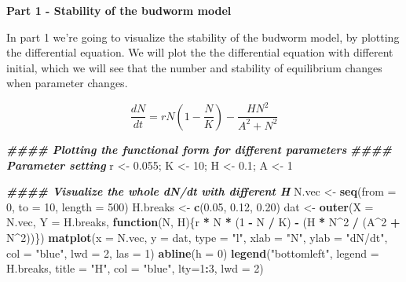 \documentclass[
]{book}
\newenvironment{Shaded}{\begin{snugshade}}{\end{snugshade}}
\newcommand{\AttributeTok}[1]{\textcolor[rgb]{0.13,0.29,0.53}{#1}}
\newcommand{\ControlFlowTok}[1]{\textcolor[rgb]{0.13,0.29,0.53}{\textbf{#1}}}
\newcommand{\DecValTok}[1]{\textcolor[rgb]{0.00,0.00,0.81}{#1}}
\newcommand{\DocumentationTok}[1]{\textcolor[rgb]{0.56,0.35,0.01}{\textbf{\textit{#1}}}}
\newcommand{\FloatTok}[1]{\textcolor[rgb]{0.00,0.00,0.81}{#1}}
\newcommand{\FunctionTok}[1]{\textcolor[rgb]{0.13,0.29,0.53}{\textbf{#1}}}
\newcommand{\NormalTok}[1]{#1}
\newcommand{\OtherTok}[1]{\textcolor[rgb]{0.56,0.35,0.01}{#1}}
\newcommand{\SpecialCharTok}[1]{\textcolor[rgb]{0.81,0.36,0.00}{\textbf{#1}}}
\newcommand{\StringTok}[1]{\textcolor[rgb]{0.31,0.60,0.02}{#1}}
\begin{document}
\textbf{Part 1 - Stability of the budworm model}

In part 1 we're going to visualize the stability of the budworm model,
by plotting the differential equation. We will plot the the differential
equation with different initial, which we will see that the number and stability of equilibrium changes when parameter changes.

\[
\dfrac{dN}{dt} = rN(1 - \dfrac{N}{K}) - \dfrac{HN^2}{A^2 + N^2}
\]

\begin{Shaded}
\begin{Highlighting}[]
\DocumentationTok{\#\#\#\# Plotting the functional form for different parameters}
\DocumentationTok{\#\#\#\# Parameter setting}
\NormalTok{r }\OtherTok{\textless{}{-}} \FloatTok{0.055}\NormalTok{; K }\OtherTok{\textless{}{-}} \DecValTok{10}\NormalTok{; H }\OtherTok{\textless{}{-}} \FloatTok{0.1}\NormalTok{; A }\OtherTok{\textless{}{-}} \DecValTok{1}

\DocumentationTok{\#\#\#\# Visualize the whole dN/dt with different H}
\NormalTok{N.vec }\OtherTok{\textless{}{-}} \FunctionTok{seq}\NormalTok{(}\AttributeTok{from =} \DecValTok{0}\NormalTok{, }\AttributeTok{to =} \DecValTok{10}\NormalTok{, }\AttributeTok{length =} \DecValTok{500}\NormalTok{)}
\NormalTok{H.breaks }\OtherTok{\textless{}{-}} \FunctionTok{c}\NormalTok{(}\FloatTok{0.05}\NormalTok{, }\FloatTok{0.12}\NormalTok{, }\FloatTok{0.20}\NormalTok{)}
\NormalTok{dat }\OtherTok{\textless{}{-}} \FunctionTok{outer}\NormalTok{(}\AttributeTok{X =}\NormalTok{ N.vec, }\AttributeTok{Y =}\NormalTok{ H.breaks,}
             \ControlFlowTok{function}\NormalTok{(N, H)\{r }\SpecialCharTok{*}\NormalTok{ N }\SpecialCharTok{*}\NormalTok{ (}\DecValTok{1} \SpecialCharTok{{-}}\NormalTok{ N }\SpecialCharTok{/}\NormalTok{ K) }\SpecialCharTok{{-}}\NormalTok{ (H }\SpecialCharTok{*}\NormalTok{ N}\SpecialCharTok{\^{}}\DecValTok{2} \SpecialCharTok{/}\NormalTok{ (A}\SpecialCharTok{\^{}}\DecValTok{2} \SpecialCharTok{+}\NormalTok{ N}\SpecialCharTok{\^{}}\DecValTok{2}\NormalTok{))\})}
\FunctionTok{matplot}\NormalTok{(}\AttributeTok{x =}\NormalTok{ N.vec, }\AttributeTok{y =}\NormalTok{ dat, }\AttributeTok{type =} \StringTok{"l"}\NormalTok{, }
        \AttributeTok{xlab =} \StringTok{"N"}\NormalTok{, }\AttributeTok{ylab =} \StringTok{"dN/dt"}\NormalTok{, }\AttributeTok{col =} \StringTok{"blue"}\NormalTok{, }\AttributeTok{lwd =} \DecValTok{2}\NormalTok{, }\AttributeTok{las =} \DecValTok{1}\NormalTok{)}
\FunctionTok{abline}\NormalTok{(}\AttributeTok{h =} \DecValTok{0}\NormalTok{)}
\FunctionTok{legend}\NormalTok{(}\StringTok{"bottomleft"}\NormalTok{, }\AttributeTok{legend =}\NormalTok{ H.breaks, }\AttributeTok{title =} \StringTok{"H"}\NormalTok{, }\AttributeTok{col =} \StringTok{"blue"}\NormalTok{, }\AttributeTok{lty=}\DecValTok{1}\SpecialCharTok{:}\DecValTok{3}\NormalTok{, }\AttributeTok{lwd =} \DecValTok{2}\NormalTok{)}
\end{Highlighting}
\end{Shaded}
\end{document}
